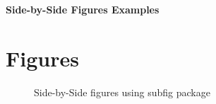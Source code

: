 \documentclass[10pt, a4paper]{article}
\begin{document}
\begin{center}
\textbf{\large Side-by-Side Figures Examples}\\
\end{center}

\section*{Figures}
\begin{figure}[h!]
\centering
{}
\hspace{0.05\textwidth}

\caption{Side-by-Side figures using subfig package}
\label{fig:sidebyside}
\end{figure}
\end{document}
